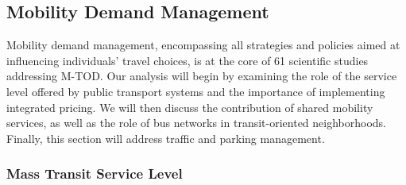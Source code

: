 \begin{refsegment}
\subsection{Mobility Demand Management
    \label{chap2:gestion-demande-mobilite}
    }

Mobility demand management, encompassing all strategies and policies aimed at influencing individuals' travel choices, is at the core of 61 scientific studies addressing \acrshort{M-TOD}. Our analysis will begin by examining the role of the service level offered by public transport systems and the importance of implementing integrated pricing. We will then discuss the contribution of shared mobility services, as well as the role of bus networks in transit-oriented neighborhoods. Finally, this section will address traffic and parking management.%

\subsubsection*{Mass Transit Service Level
    \label{chap2:niveau-service}
    }


\end{refsegment}
